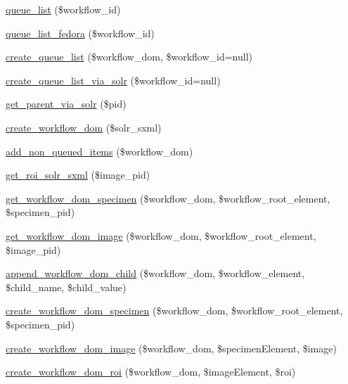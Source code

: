 \begin{DoxyCompactItemize}
\item 
\hyperlink{workspace_8functions_8php_ae140dc481a8fe939aefbfa1dbd61f345}{queue\_\-list} (\$workflow\_\-id)
\item 
\hyperlink{workspace_8functions_8php_aae638a872b51c2508581ad462dd985bb}{queue\_\-list\_\-fedora} (\$workflow\_\-id)
\item 
\hyperlink{workspace_8functions_8php_a9e49f9eb721481e7144e045c3dc714d0}{create\_\-queue\_\-list} (\$workflow\_\-dom, \$workflow\_\-id=null)
\item 
\hyperlink{workspace_8functions_8php_a03809983fff35fb23a8e7d7788cc6b0e}{create\_\-queue\_\-list\_\-via\_\-solr} (\$workflow\_\-id=null)
\item 
\hyperlink{workspace_8functions_8php_a75e0ded2e7d256d7c50a84c8ec47acbd}{get\_\-parent\_\-via\_\-solr} (\$pid)
\item 
\hyperlink{workspace_8functions_8php_a004e58be3cc3bc417d4649db23f2089c}{create\_\-workflow\_\-dom} (\$solr\_\-sxml)
\item 
\hyperlink{workspace_8functions_8php_a6615ff66fec46bb4f8574f8d9910f5cb}{add\_\-non\_\-queued\_\-items} (\$workflow\_\-dom)
\item 
\hyperlink{workspace_8functions_8php_ae6abbcdfbf74b12c5d08a29ca8feafab}{get\_\-roi\_\-solr\_\-sxml} (\$image\_\-pid)
\item 
\hyperlink{workspace_8functions_8php_a6118f481ac5e7b30edc6442f7c181829}{get\_\-workflow\_\-dom\_\-specimen} (\$workflow\_\-dom, \$workflow\_\-root\_\-element, \$specimen\_\-pid)
\item 
\hyperlink{workspace_8functions_8php_a710d72e0f09268599d3349600150785e}{get\_\-workflow\_\-dom\_\-image} (\$workflow\_\-dom, \$workflow\_\-root\_\-element, \$image\_\-pid)
\item 
\hyperlink{workspace_8functions_8php_a245ca1ffb4324b1074534fd6db5ef0df}{append\_\-workflow\_\-dom\_\-child} (\$workflow\_\-dom, \$workflow\_\-element, \$child\_\-name, \$child\_\-value)
\item 
\hyperlink{workspace_8functions_8php_afc7c3079ed1dae453510d27a4bf09a82}{create\_\-workflow\_\-dom\_\-specimen} (\$workflow\_\-dom, \$workflow\_\-root\_\-element, \$specimen\_\-pid)
\item 
\hyperlink{workspace_8functions_8php_ad37f55c7999d3a7ea44fddd01846cf23}{create\_\-workflow\_\-dom\_\-image} (\$workflow\_\-dom, \$specimenElement, \$image)
\item 
\hyperlink{workspace_8functions_8php_a3f73ed40f7993e373ce17d85824abb83}{create\_\-workflow\_\-dom\_\-roi} (\$workflow\_\-dom, \$imageElement, \$roi)

\end{DoxyCompactItemize}
